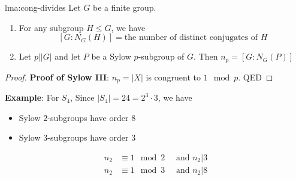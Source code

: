 \documentclass{article}
\begin{document}
\begin{lma}[]{lma:cong-divides}{}
    Let $G$ be a finite group.
    \begin{enumerate}
        \item For any subgroup $H \le G$, we have
            \[[G : N_{G}(H)] = \text{the number of distinct conjugates of $H$}\]
        \item Let $p\lvert \lvert G \rvert$ and let $P$ be a Sylow $p$-subgroup of $G$. Then $n_{p} = [G : N_{G}(P)]$
    \end{enumerate}
\end{lma}

\begin{proof}
    \textbf{Proof of Sylow III}: $n_{p} = \lvert X \rvert$ is congruent to $1 \mod p$. QED
\end{proof}

\textbf{Example}: For $S_{4}$, Since $\lvert S_{4} \rvert = 24 = 2^{3} \cdot 3$, we have
\begin{itemize}
    \item Sylow $2$-subgroups have order $8$
    \item Sylow $3$-subgroups have order 3
\end{itemize}
\begin{align*}
    n_{2} & \equiv 1 \mod 2 \quad \text{ and } n_{2} | 3\\
    n_{2} & \equiv 1 \mod 3 \quad \text{ and } n_{2} | 8\\
\end{align*}
\end{document}
